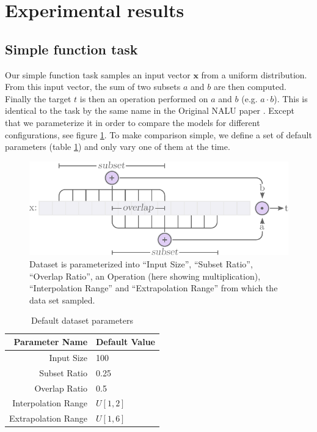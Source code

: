 \section{Experimental results}

\subsection{Simple function task}

Our simple function task samples an input vector $\mathbf{x}$ from a uniform distribution. From this input vector, the sum of two subsets $a$ and $b$ are then computed. Finally the target $t$ is then an operation performed on $a$ and $b$ (e.g. $a \cdot b$). This is identical to the task by the same name in the Original NALU paper \cite{trask-nalu}. Except that we parameterize it in order to compare the models for different configurations, see figure \ref{fig:simple-function-task-problem}. To make comparison simple, we define a set of default parameters (table \ref{tab:simple-function-task-defaults}) and only vary one of them at the time.

\begin{figure}[H]
\centering
\includegraphics[scale=0.8]{graphics/function_task_static_problem.pdf}
\caption{Dataset is parameterized into ``Input Size'', ``Subset Ratio'', ``Overlap Ratio'', an Operation (here showing multiplication), ``Interpolation Range'' and ``Extrapolation Range'' from which the data set sampled.}
\label{fig:simple-function-task-problem}
\end{figure}

\begin{table}[H]
\caption{Default dataset parameters}
\label{tab:simple-function-task-defaults}
\centering
\begin{tabular}{r l}
\toprule
 Parameter Name & Default Value \\
 \midrule
 Input Size & 100 \\
 Subset Ratio & 0.25 \\
 Overlap Ratio & 0.5 \\
 Interpolation Range & $U[1,2]$ \\
 Extrapolation Range & $U[1,6]$ \\
 \bottomrule
\end{tabular}
\end{table}

